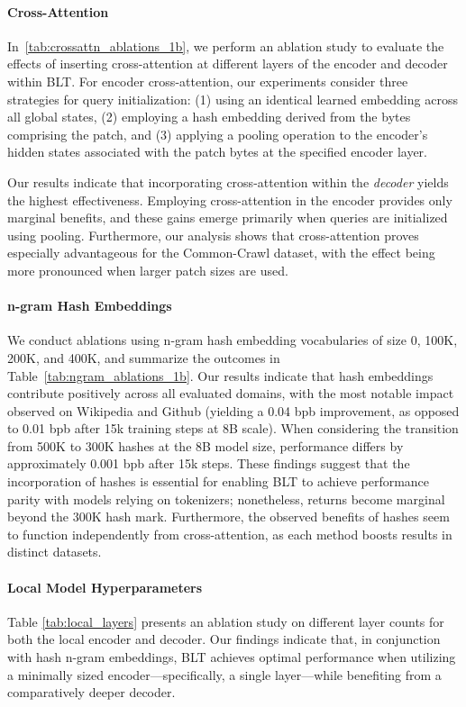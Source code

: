 \paragraph{Cross-Attention} 
In~\autoref{tab:crossattn_ablations_1b}, we perform an ablation study to evaluate the effects of inserting cross-attention at different layers of the encoder and decoder within {\textsc BLT}. For encoder cross-attention, our experiments consider three strategies for query initialization: (1) using an identical learned embedding across all global states, (2) employing a hash embedding derived from the bytes comprising the patch, and (3) applying a pooling operation to the encoder’s hidden states associated with the patch bytes at the specified encoder layer.

Our results indicate that incorporating cross-attention within the \textit{decoder} yields the highest effectiveness. Employing cross-attention in the encoder provides only marginal benefits, and these gains emerge primarily when queries are initialized using pooling. Furthermore, our analysis shows that cross-attention proves especially advantageous for the Common-Crawl dataset, with the effect being more pronounced when larger patch sizes are used.

\paragraph{n-gram Hash Embeddings} 

We conduct ablations using n-gram hash embedding vocabularies of size 0, 100K, 200K, and 400K, and summarize the outcomes in Table~\ref{tab:ngram_ablations_1b}. Our results indicate that hash embeddings contribute positively across all evaluated domains, with the most notable impact observed on Wikipedia and Github (yielding a 0.04 bpb improvement, as opposed to 0.01 bpb after 15k training steps at 8B scale). When considering the transition from 500K to 300K hashes at the 8B model size, performance differs by approximately 0.001 bpb after 15k steps. These findings suggest that the incorporation of hashes is essential for enabling {\textsc BLT} to achieve performance parity with models relying on tokenizers; nonetheless, returns become marginal beyond the 300K hash mark. Furthermore, the observed benefits of hashes seem to function independently from cross-attention, as each method boosts results in distinct datasets.

\paragraph{Local Model Hyperparameters} Table \ref{tab:local_layers} presents an ablation study on different layer counts for both the local encoder and decoder. Our findings indicate that, in conjunction with hash n-gram embeddings, {\textsc BLT} achieves optimal performance when utilizing a minimally sized encoder—specifically, a single layer—while benefiting from a comparatively deeper decoder.

